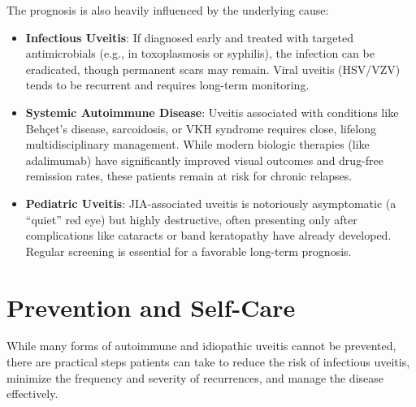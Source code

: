 The prognosis is also heavily influenced by the underlying cause:
\begin{itemize}
    \item \textbf{Infectious Uveitis}: If diagnosed early and treated with targeted antimicrobials (e.g., in toxoplasmosis or syphilis), the infection can be eradicated, though permanent scars may remain. Viral uveitis (HSV/VZV) tends to be recurrent and requires long-term monitoring.
    \item \textbf{Systemic Autoimmune Disease}: Uveitis associated with conditions like Beh\c{c}et's disease, sarcoidosis, or VKH syndrome requires close, lifelong multidisciplinary management. While modern biologic therapies (like adalimumab) have significantly improved visual outcomes and drug-free remission rates, these patients remain at risk for chronic relapses.
    \item \textbf{Pediatric Uveitis}: JIA-associated uveitis is notoriously asymptomatic (a ``quiet'' red eye) but highly destructive, often presenting only after complications like cataracts or band keratopathy have already developed. Regular screening is essential for a favorable long-term prognosis.
\end{itemize}

\section*{Prevention and Self-Care}
While many forms of autoimmune and idiopathic uveitis cannot be prevented, there are practical steps patients can take to reduce the risk of infectious uveitis, minimize the frequency and severity of recurrences, and manage the disease effectively.

